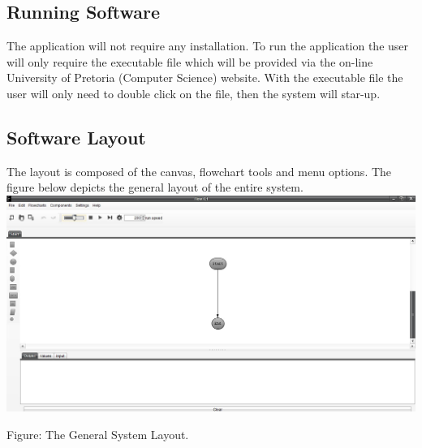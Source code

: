 \documentclass[11pt,a4paper,titlepage]{article}
\begin{document}








	
	\subsection{Running Software}
		The application will not require any installation. To run the application the user will only require the executable file which will be provided via the on-line University of Pretoria (Computer Science) website. With the executable file the user will only need to double click on the file, then the system will star-up.
		
		\subsection{Software Layout}
		The layout is composed of the canvas, flowchart tools and menu options. \newline 
		The figure below depicts the general layout of the entire system. \newline \newline
		\includegraphics[width=\textwidth]{SystemLayout.jpg}
		\begin{center}
		Figure: The General System Layout.
		\end{center}
		
\end{document}
